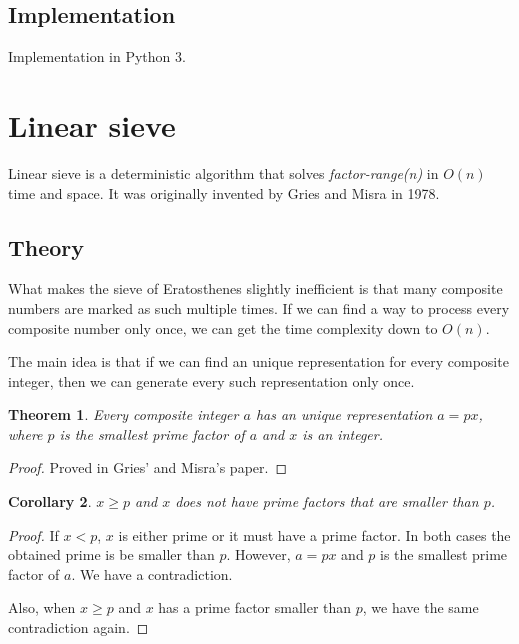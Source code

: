 \documentclass[12pt] {article}
\theoremstyle{plain}
\newtheorem{thm}{Theorem}[section]
\newtheorem{cor}[thm]{Corollary}
\theoremstyle{definition}
\begin{document}
\subsection {Implementation}

Implementation in Python 3.



\section {Linear sieve}

Linear sieve is a deterministic algorithm that solves \textit{factor-range(n)} in $O(n)$ time and space. It was originally invented by Gries and Misra in 1978\cite{gries}.

\subsection {Theory}

What makes the sieve of Eratosthenes slightly inefficient is that many composite numbers are marked as such multiple times. If we can find a way to process every composite number only once, we can get the time complexity down to $O(n)$.

The main idea is that if we can find an unique representation for every composite integer, then we can generate every such representation only once.

\begin{thm}
\label {thm:comprepr}
Every composite integer $a$ has an unique representation $a = px$, where $p$ is the smallest prime factor of $a$ and $x$ is an integer.
\end{thm}

\begin{proof}
Proved in Gries' and Misra's paper\cite{gries}.
\end{proof}

\begin{cor}
\label {cor:pflimit}
$x \geq p$ and $x$ does not have prime factors that are smaller than $p$.
\end{cor}

\begin{proof}
If $x < p$, $x$ is either prime or it must have a prime factor. In both cases the obtained prime is be smaller than $p$. However, $a = px$ and $p$ is the smallest prime factor of $a$. We have a contradiction.

Also, when $x \geq p$ and $x$ has a prime factor smaller than $p$, we have the same contradiction again.
\end{proof}
\end{document}
